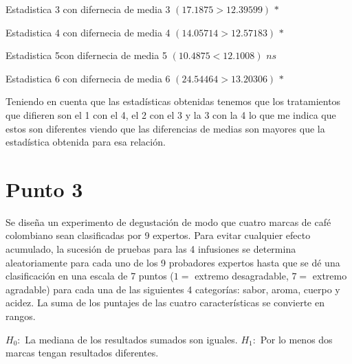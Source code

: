 \documentclass[
]{article}
\begin{document}
Estadistica 3 con difernecia de media 3 \((17.1875>12.39599)\) \(*\)

Estadistica 4 con difernecia de media 4 \((14.05714 >12.57183)\) \(*\)

Estadistica 5con difernecia de media 5 \((10.4875 <12.1008 )\) \(ns\)

Estadistica 6 con difernecia de media 6 \((24.54464 >13.20306)\) \(*\)

Teniendo en cuenta que las estadísticas obtenidas tenemos que los
tratamientos que difieren son el 1 con el 4, el 2 con el 3 y la 3 con la
4 lo que me indica que estos son diferentes viendo que las diferencias
de medias son mayores que la estadística obtenida para esa relación.

\hypertarget{punto-3}{%
\section{Punto 3}\label{punto-3}}

Se diseña un experimento de degustación de modo que cuatro marcas de
café colombiano sean clasificadas por 9 expertos. Para evitar cualquier
efecto acumulado, la sucesión de pruebas para las 4 infusiones se
determina aleatoriamente para cada uno de los 9 probadores expertos
hasta que se dé una clasificación en una escala de 7 puntos (\(1=\)
extremo desagradable, \(7=\) extremo agradable) para cada una de las
siguientes 4 categorías: sabor, aroma, cuerpo y acidez. La suma de los
puntajes de las cuatro características se convierte en rangos.

\(H_0 :\) La mediana de los resultados sumados son iguales. \(H_1 :\)
Por lo menos dos marcas tengan resultados diferentes.
\end{document}
